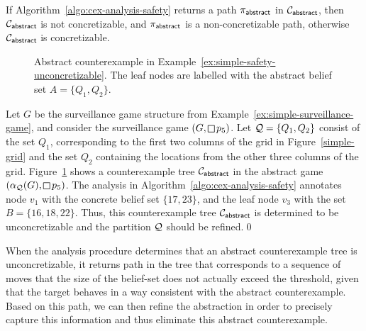 \begin{theorem}
If Algorithm~\ref{algo:cex-analysis-safety} returns a path $\pi_{\mathsf{abstract}}$ in $\mathcal{C}_{\mathsf{abstract}}$, then $\mathcal{C}_{\mathsf{abstract}}$ is not concretizable, and $\pi_{\mathsf{abstract}}$ is a non-concretizable path, otherwise  $\mathcal{C}_{\mathsf{abstract}}$ is concretizable.
\end{theorem}

\begin{figure}
\begin{center}

\end{center}
\vspace{-.2cm}
\caption{Abstract counterexample in Example~\ref{ex:simple-safety-unconcretizable}. The leaf nodes are labelled with the abstract belief set $A = \{Q_1,Q_2\}$.}
\label{fig:simple-safety-counterex-1}
\vspace{-.5cm}
\end{figure}

\begin{example}\label{ex:simple-safety-unconcretizable}
Let $G$ be the surveillance game structure from Example~\ref{ex:simple-surveillance-game}, and consider the surveillance game $(G,\LTLglobally p_5)$. 
Let $\mathcal{Q} = \{Q_1,Q_2\}$ consist of the set $Q_1$, corresponding to the first two columns of the grid in Figure~\ref{simple-grid} and the set $Q_2$ containing the locations from the other three columns of the grid. Figure~\ref{fig:simple-safety-counterex-1} shows a counterexample tree $\mathcal{C}_{\mathsf{abstract}}$ in the abstract game $(\alpha_\part(G),\LTLglobally p_5)$. The analysis in Algorithm~\ref{algo:cex-analysis-safety} annotates node $v_1$ with the concrete belief set $\{17,23\}$, and the leaf node $v_3$ with the set $B = \{16,18,22\}$. Thus, this counterexample tree $\mathcal{C}_{\mathsf{abstract}}$ is determined to be unconcretizable and the partition $\mathcal{Q}$ should be refined.\qed
\end{example}

When the analysis procedure determines that an abstract counterexample tree is unconcretizable, it returns path in the tree that corresponds to a sequence of moves that the size of the belief-set does not actually exceed the threshold, given that the target behaves in a way consistent with the abstract counterexample.  Based on this path, we can then refine the abstraction in order to precisely capture this information and thus eliminate this abstract counterexample.


